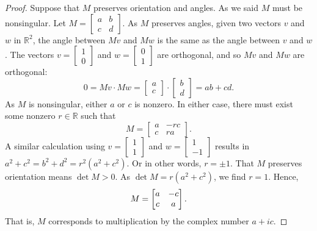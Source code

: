 \documentclass[12pt,openany]{book}
\newcommand{\avoidbreak}{\postdisplaypenalty=100}
\newcommand{\R}{{\mathbb{R}}}
\theoremstyle{plain}
\theoremstyle{remark}
\theoremstyle{definition}
\theoremstyle{exercise}
\theoremstyle{example}
\begin{document}
\begin{proof}
Suppose that $M$ preserves orientation and angles.
As we said $M$ must be nonsingular.
Let $M =
\left[\begin{smallmatrix}a&b\\c&d\end{smallmatrix}\right]$.
As $M$ preserves angles, given two vectors $v$ and
$w$ in $\R^2$, the angle between $Mv$ and $Mw$ is the same as the angle
between $v$ and $w$.
The vectors
$v=\left[\begin{smallmatrix}1\\0\end{smallmatrix}\right]$ and
$w=\left[\begin{smallmatrix}0\\1\end{smallmatrix}\right]$ are
orthogonal, and so $Mv$ and $Mw$ are orthogonal:
\begin{equation*}
0 = Mv \cdot Mw = 
\begin{bmatrix} a\\c \end{bmatrix}
\cdot
\begin{bmatrix} b\\d \end{bmatrix}
=
ab+cd .
\end{equation*}
As $M$ is nonsingular, either $a$ or $c$ is nonzero.  In either case,
there must exist some nonzero $r \in \R$ such that
\begin{equation*}
M =
\begin{bmatrix}
a &-rc \\
c & ra
\end{bmatrix} .
\end{equation*}
A similar calculation using
$v=\left[\begin{smallmatrix}1\\1\end{smallmatrix}\right]$ and
$w=\left[\begin{smallmatrix}1\\-1\end{smallmatrix}\right]$ results in
$a^2+c^2 = b^2+d^2 = r^2(a^2+c^2)$.  Or in other words, $r=\pm 1$.
That $M$ preserves orientation means $\det M > 0$.
As $\det M = r(a^2+c^2)$, we find $r=1$.
Hence,
\begin{equation*}
M =
\begin{bmatrix}
a & -c \\
c &  a
\end{bmatrix} .
\avoidbreak
\end{equation*}
That is, $M$ corresponds to multiplication by the complex number
$a+ic$.


\end{proof}
\end{document}
